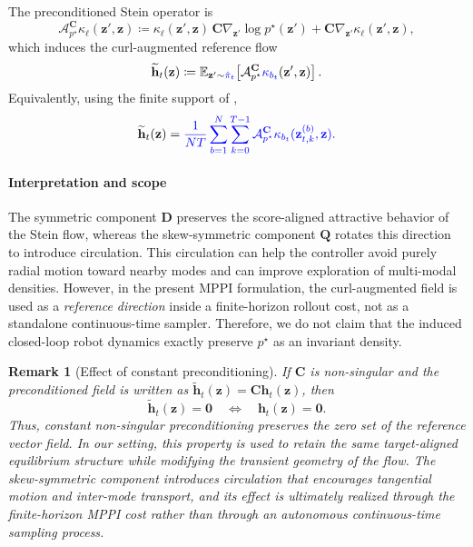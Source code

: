 \documentclass[conference]{IEEEtran}
\newtheorem{remark}{Remark}
\newcommand{\cl}[1]{{\color{blue}{{#1}}}}
\begin{document}
The preconditioned Stein operator is
\begin{equation}\label{eq:stein_operator_A}
\mathcal A^{\mathbf C}_{p^\star} \kappa_\ell(\mathbf z',\mathbf z)
\coloneqq
\kappa_\ell(\mathbf z',\mathbf z)\,
\mathbf C\nabla_{\mathbf z'}\log p^\star(\mathbf z')
+
\mathbf C\nabla_{\mathbf z'}\kappa_\ell(\mathbf z',\mathbf z),
\end{equation}
which induces the curl-augmented reference flow
\begin{equation}\label{eq:stein_reference_flow_A}
\widetilde{\mathbf h}_t(\mathbf z)
\coloneqq
\mathbb E_{\mathbf z'\sim \cl{\hat{\pi}_t}}
\!\left[
\mathcal A^{\mathbf C}_{p^\star} \cl{\kappa_{b_t}}(\mathbf z',\mathbf z)
\right].
\end{equation}
Equivalently, using the finite support of \cl{$\hat{\pi}_t$},
\begin{equation}\label{eq:stein_reference_flow_A_finite}
\widetilde{\mathbf h}_t(\mathbf z)
=
\cl{\frac{1}{NT}
\sum_{b=1}^{N}\sum_{k=0}^{T-1}
\mathcal A^{\mathbf C}_{p^\star} \kappa_{b_t}(\mathbf z_{t,k}^{(b)},\mathbf z).}
\end{equation}

\paragraph{Interpretation and scope}
The symmetric component $\mathbf D$ preserves the score-aligned attractive behavior of the Stein flow, whereas the skew-symmetric component $\mathbf Q$ rotates this direction to introduce circulation. This circulation can help the controller avoid purely radial motion toward nearby modes and can improve exploration of multi-modal densities. However, in the present MPPI formulation, the curl-augmented field is used as a \emph{reference direction} inside a finite-horizon rollout cost, not as a standalone continuous-time sampler. Therefore, we do not claim that the induced closed-loop robot dynamics exactly preserve $p^\star$ as an invariant density.

\begin{remark}[Effect of constant preconditioning]\label{rem:preconditioning}
If $\mathbf C$ is non-singular and the preconditioned field is written as
$\widetilde{\mathbf h}_t(\mathbf z)=\mathbf C\mathbf h_t(\mathbf z)$, then
\begin{equation}
\widetilde{\mathbf h}_t(\mathbf z)=\mathbf 0
\quad \Longleftrightarrow \quad
\mathbf h_t(\mathbf z)=\mathbf 0.
\end{equation}
Thus, constant non-singular preconditioning preserves the zero set of the reference vector field. In our setting, this property is used to retain the same target-aligned equilibrium structure while modifying the transient geometry of the flow. The skew-symmetric component introduces circulation that encourages tangential motion and inter-mode transport, and its effect is ultimately realized through the finite-horizon MPPI cost rather than through an autonomous continuous-time sampling process.
\end{remark}
\end{document}
